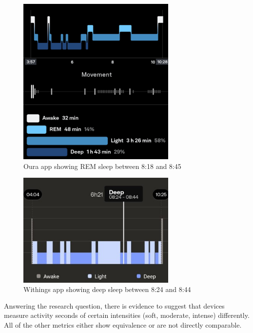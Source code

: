 \begin{figure}
    
    \centering
    \includegraphics[width=0.7\textwidth,keepaspectratio]{../images/oura_rem.png}
    \caption{Oura app showing REM sleep between 8:18 and 8:45}
    \label{fig:ouraRem}
    
\end{figure}
\begin{figure}
    
    \centering
    \includegraphics[width=0.7\textwidth,keepaspectratio]{../images/withings_rem.jpg}
    \caption{Withings app showing deep sleep between 8:24 and 8:44}
    \label{fig:withingsRem}
    
\end{figure}
Answering the research question, there is evidence to suggest that devices measure activity seconds of certain intensities (soft, moderate, intense) differently. All of the other metrics either show equivalence or are not directly comparable. 